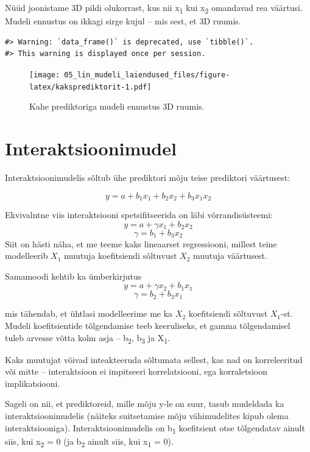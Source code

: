 \documentclass[]{book}
\begin{document}
Nüüd joonistame 3D pildi olukorrast, kus nii x\textsubscript{1} kui
x\textsubscript{2} omandavad rea väärtusi. Mudeli ennustus on ikkagi
sirge kujul -- mis sest, et 3D ruumis.



\begin{verbatim}
#> Warning: `data_frame()` is deprecated, use `tibble()`.
#> This warning is displayed once per session.
\end{verbatim}

\begin{figure}
\centering
\texttt{[image: 05\_lin\_mudeli\_laiendused\_files/figure-latex/kaksprediktorit-1.pdf]}
\caption{\label{fig:kaksprediktorit}Kahe prediktoriga mudeli ennustus 3D ruumis.}
\end{figure}

\section{Interaktsioonimudel}\label{interaktsioonimudel}

Interaktsioonimudelis sõltub ühe prediktori mõju teise prediktori
väärtusest:

\[y = a + b_1x_1 + b_2x_2 + b_3x_1x_2\]

Ekvivalntne viis interaktsiooni spetsifitseerida on läbi
võrrandisüsteemi: \[y = a + \gamma x_1 + b_2x_2\]
\[\gamma = b_1 + b_3x_2\] Siit on hästi näha, et me teeme kaks
lineaarset regressiooni, millest teine modelleerib \(X_1\) muutuja
koefitsiendi sõltuvust \(X_2\) muutuja väärtusest.

Samamoodi kehtib ka ümberkirjutus \[y = a + \gamma x_2 + b_1x_1\]
\[\gamma = b_2 + b_3x_1\]

mis tähendab, et ühtlasi modelleerime me ka \(X_2\) koefitsiendi
sõltuvust \(X_1\)-st. Mudeli koefitsientide tõlgendamise teeb
keeruliseks, et gamma tõlgendamisel tuleb arvesse võtta kolm asja --
b\textsubscript{2}, b\textsubscript{3} ja X\textsubscript{1}.

Kaks muutujat võivad inteakteeruda sõltumata sellest, kas nad on
korreleeritud või mitte -- interaktsioon ei impitseeri korrelatsiooni,
ega korraletsioon implikatsiooni.

Sageli on nii, et prediktoreid, mille mõju y-le on suur, tasub mudeldada
ka interaktsioonimudelis (näiteks suitsetamise mõju vähimudelites kipub
olema interaktsiooniga). Interaktsioonimudelis on b\textsubscript{1}
koefitsient otse tõlgendatav ainult siis, kui x\textsubscript{2} = 0 (ja
b\textsubscript{2} ainult siis, kui x\textsubscript{1} = 0).
\end{document}
